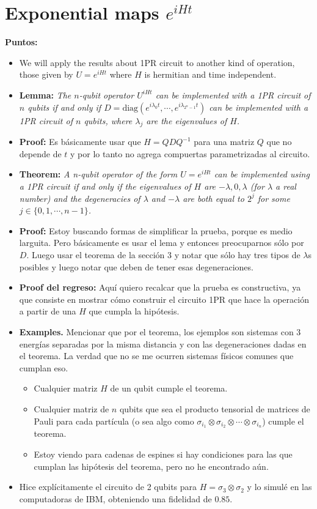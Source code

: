 \documentclass[10pt,letterpaper]{article} %
\begin{document}
\section{Exponential maps $e^{iHt}$} %
\label{sec: Exponential maps}
\textbf{Puntos:}
\begin{itemize}
\item We will apply the results about 1PR circuit to another kind of operation, those given by $U  = e^{iHt}$ where $H$ is hermitian  and time independent.
\item \textbf{Lemma:}\textit{ The $n$-qubit operator $U^{iHt}$ can be implemented with a 1PR circuit of $n$ qubits if and only if $D = \text{diag}(e^{i\lambda_0 t}, \cdots, e^{i \lambda_{2^n-1}t})$ can be implemented with a 1PR circuit of $n$ qubits, where $\lambda_j$ are the eigenvalues of $H$.}
\item \textbf{Proof:}  Es b\'asicamente usar que $H = QDQ^{-1}$ para una matriz $Q$ que no depende de $t$ y por lo tanto no agrega compuertas parametrizadas al circuito. 
\item \textbf{Theorem:} \textit{ A n-qubit operator of the form $U = e^{iHt}$ can be implemented using a 1PR circuit if and only if the eigenvalues of $H$ are $-\lambda,0,\lambda$ (for $\lambda$ a real number) and the degeneracies of $\lambda$ and $-\lambda$ are both equal to $2^j$ for some $j\in \{0,1,\cdots,n-1\}$.}
\item \textbf{Proof:} Estoy buscando formas de simplificar la prueba, porque es medio larguita. Pero básicamente es usar el lema y entonces preocuparnos sólo por $D$. Luego  usar el teorema de la sección 3 y notar que sólo hay tres tipos de  $\lambda$s posibles y luego notar que deben de tener esas degeneraciones.
\item \textbf{Proof del regreso:} Aquí quiero recalcar que la prueba es constructiva, ya que consiste en mostrar cómo construir el circuito 1PR que hace la operación a partir de una $H$ que cumpla la hipótesis. 
\item \textbf{Examples.} Mencionar que por el teorema, los ejemplos son sistemas con 3 energías separadas por la misma distancia y con las degeneraciones dadas en el teorema. 
La verdad que no se me ocurren sistemas físicos comunes que cumplan eso.
\begin{itemize}
\item Cualquier matriz $H$ de un qubit cumple el teorema.
\item Cualquier matriz de $n$ qubits que sea el producto tensorial de matrices de Pauli para cada partícula (o sea algo como $\sigma_{i_1} \otimes \sigma_{i_2} \otimes \cdots \otimes \sigma_{i_n}$) cumple el teorema.
\item Estoy viendo para cadenas de espines si hay condiciones para las que cumplan las hipótesis del teorema, pero no he encontrado aún.
\end{itemize}
\item Hice explícitamente el circuito de 2 qubits para $H = \sigma_3 \otimes \sigma_2$ y lo simulé en las computadoras de IBM, obteniendo una fidelidad de $0.85$.
\end{itemize}
\end{document}
